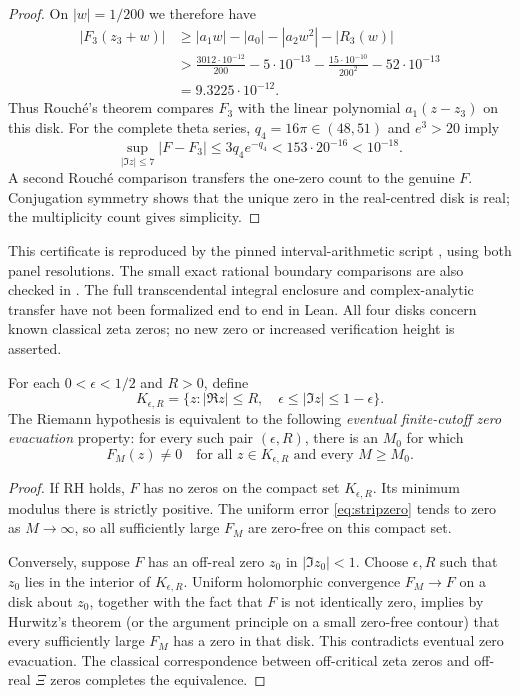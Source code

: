\begin{proof}
On $|w|=1/200$ we therefore have
\begin{align*}
|F_3(z_3+w)|
&\ge|a_1w|-|a_0|-|a_2w^2|-|R_3(w)|\\
&>\frac{3012\cdot10^{-12}}{200}
-5\cdot10^{-13}
-\frac{15\cdot10^{-10}}{200^2}
-52\cdot10^{-13}\\
&=9.3225\cdot10^{-12}.
\end{align*}
Thus Rouch\'e's theorem compares $F_3$ with the
linear polynomial $a_1(z-z_3)$ on this disk.
For the complete theta series,
$q_4=16\pi\in(48,51)$ and $e^3>20$ imply
\[
\sup_{|\Im z|\le7}|F-F_3|
\le3q_4e^{-q_4}
<153\cdot20^{-16}<10^{-18}.
\]
A second Rouch\'e comparison transfers the
one-zero count to the genuine $F$.
Conjugation symmetry shows that the unique
zero in the real-centred disk is real;
the multiplicity count gives simplicity.
\end{proof}

This certificate is reproduced by the pinned
interval-arithmetic script
,
using both panel resolutions. The small exact
rational boundary comparisons are also checked
in .
The full transcendental integral enclosure and
complex-analytic transfer have not been
formalized end to end in Lean.
All four disks concern known classical zeta
zeros; no new zero or increased verification
height is asserted.

\begin{proposition}
\label{prop:zeromigration}
For each $0<\epsilon<1/2$ and
$R>0$, define
\[
K_{\epsilon,R}=
\{z:|\Re z|\le R,\quad
\epsilon\le|\Im z|\le1-\epsilon\}.
\]
The Riemann hypothesis is equivalent
to the following \emph{eventual
finite-cutoff zero evacuation} property:
for every such pair $(\epsilon,R)$,
there is an $M_0$ for which
\[
F_M(z)\ne0\quad
\text{for all }z\in K_{\epsilon,R}
\text{ and every }M\ge M_0.
\]
\end{proposition}
\begin{proof}
If RH holds, $F$ has no zeros
on the compact set $K_{\epsilon,R}$.
Its minimum modulus there is
strictly positive. The uniform
error \eqref{eq:stripzero}
tends to zero as $M\to\infty$,
so all sufficiently large $F_M$
are zero-free on this compact set.

Conversely, suppose $F$ has an
off-real zero $z_0$ in
$|\Im z_0|<1$. Choose
$\epsilon,R$ such that $z_0$
lies in the interior of
$K_{\epsilon,R}$. Uniform
holomorphic convergence
$F_M\to F$ on a disk about
$z_0$, together with the fact
that $F$ is not identically
zero, implies by Hurwitz's
theorem (or the argument
principle on a small zero-free
contour) that every
sufficiently large $F_M$
has a zero in that disk.
This contradicts eventual
zero evacuation. The
classical correspondence
between off-critical
zeta zeros and off-real
$\Xi$ zeros completes the
equivalence.
\end{proof}

